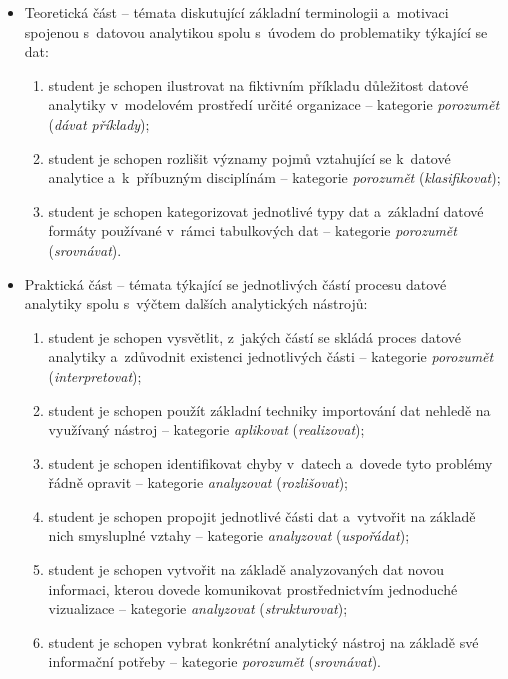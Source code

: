 \begin{itemize}
\tightlist
\item
  Teoretická část -- témata diskutující základní terminologii a~motivaci spojenou s~datovou analytikou spolu s~úvodem do problematiky týkající se dat:

  \begin{enumerate}
  \def\labelenumi{\arabic{enumi}.}
  \tightlist
  \item
    student je schopen ilustrovat na fiktivním příkladu důležitost datové analytiky v~modelovém prostředí určité organizace -- kategorie \emph{porozumět} (\emph{dávat příklady})\label{1-cil};
  \item
    student je schopen rozlišit významy pojmů vztahující se k~datové analytice a~k~příbuzným disciplínám -- kategorie \emph{porozumět} (\emph{klasifikovat})\label{2-cil};
  \item
    student je schopen kategorizovat jednotlivé typy dat a~základní datové formáty používané v~rámci tabulkových dat -- kategorie \emph{porozumět} (\emph{srovnávat})\label{3-cil}.
  \end{enumerate}
\item
  Praktická část -- témata týkající se jednotlivých částí procesu datové analytiky spolu s~výčtem dalších analytických nástrojů:

  \begin{enumerate}
  \def\labelenumi{\arabic{enumi}.}
  \setcounter{enumi}{3}
  \tightlist
  \item
    student je schopen vysvětlit, z~jakých částí se skládá proces datové analytiky a~zdůvodnit existenci jednotlivých části -- kategorie \emph{porozumět} (\emph{interpretovat})\label{4-cil};
  \item
    student je schopen použít základní techniky importování dat nehledě na využívaný nástroj -- kategorie \emph{aplikovat} (\emph{realizovat})\label{5-cil};
  \item
    student je schopen identifikovat chyby v~datech a~dovede tyto problémy řádně opravit -- kategorie \emph{analyzovat} (\emph{rozlišovat})\label{6-cil};
  \item
    student je schopen propojit jednotlivé části dat a~vytvořit na základě nich smysluplné vztahy -- kategorie \emph{analyzovat} (\emph{uspořádat})\label{7-cil};
  \item
    student je schopen vytvořit na základě analyzovaných dat novou informaci, kterou dovede komunikovat prostřednictvím jednoduché vizualizace -- kategorie \emph{analyzovat} (\emph{strukturovat})\label{8-cil};
  \item
    student je schopen vybrat konkrétní analytický nástroj na základě své informační potřeby -- kategorie \emph{porozumět} (\emph{srovnávat})\label{9-cil}.
  \end{enumerate}
\end{itemize}

